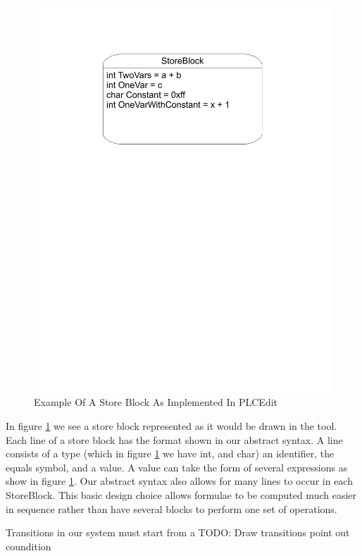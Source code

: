 \begin{figure}[htp]
    \centering
    \includegraphics[trim= 20mm 170mm 20mm 10mm, clip, width=\imgmedium]{./images/state_storeblock.pdf}
    \caption{Example Of A Store Block As Implemented In PLCEdit}
    \label{fig:state_storeblock}
\end{figure}

In figure \ref{fig:state_storeblock} we see a store block represented as it would be drawn in the tool. Each line of a store block has the format shown in our abstract syntax. A line consists of a type (which in figure \ref{fig:state_storeblock} we have int, and char) an identifier, the equals symbol, and a value. A value can take the form of several expressions as show in figure \ref{fig:state_storeblock}. Our abstract syntax also allows for many lines to occur in each StoreBlock. This basic design choice allows formulae to be computed much easier in sequence rather than have several blocks to perform one set of operations.

Transitions in our system must start from a  
TODO: Draw transitions point out coundition

